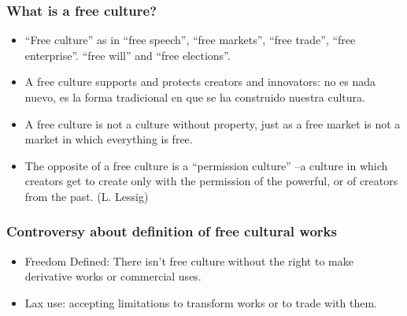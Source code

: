\begin{frame}
\frametitle{What is a free culture?}
\begin{itemize}
\item ``Free culture'' as in ``free speech'', ``free markets'', ``free  trade'', ``free enterprise''. ``free will'' and ``free elections''.
\item A free culture supports and protects creators and innovators: no es nada nuevo, es la forma tradicional en que se ha construido nuestra cultura.
\item A free culture is not a culture without property, just as a free market is not a
market in which everything is free. 
\item  The opposite of a free culture is a ``permission culture'' --a culture in which creators get to create only with the permission of the powerful, or of creators from the past. (L. Lessig)

\end{itemize}

\end{frame}


\begin{frame}
\frametitle{Controversy about definition of free cultural works}

\begin{itemize}
\item \alert{Freedom Defined}: There isn't free culture without the right to make derivative works or commercial uses.
\item \alert{Lax use}: accepting limitations to transform works or to trade with them.
\end{itemize}                                                 

\end{frame}





